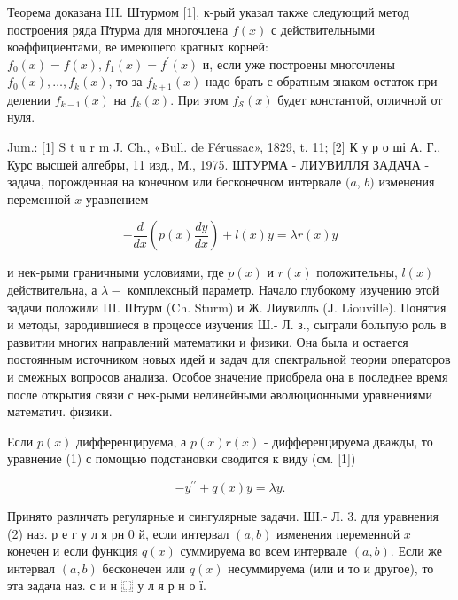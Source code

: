 \documentclass[10pt]{article}
\begin{document}
Теорема доказана III. Штурмом [1], к-рый указал также следующий метод построения ряда П̈турма для многочлена $f(x)$ с действительными коәффициентами, ве имеющего кратных корней: $f_{0}(x)=f(x), f_{1}(x)=f^{\prime}(x)$ и, если уже построены многочлены $f_{0}(x), \ldots, f_{k}(x)$, то за $f_{k+1}(x)$ надо брать с обратным знаком остаток при делении $f_{k-1}(x)$ на $f_{k}(x)$. При этом $f_{\mathcal{S}}(x)$ будет константой, отличной от нуля.



Jum.: [1] S t u r m J. Ch., «Bull. de Férussac», 1829, t. 11; [2] К у р о ші А. Г., Курс высшей алгебры, 11 изд., М., 1975. ШТУРМА - ЛИУВИЛЛЯ ЗАДАЧА - задача, порожденная на конечном или бесконечном интервале $(a$, $b)$ изменения переменной $x$ уравнением



\[

-\frac{d}{d x}\left(p(x) \frac{d y}{d x}\right)+l(x) y=\lambda r(x) y

\]



и нек-рыми граничными условиями, где $p(x)$ и $r(x)$ положительны, $l(x)$ действительна, а $\lambda-$ комплексный параметр. Начало глубокому изучению этой задачи положили III. Штурм (Ch. Sturm) и Ж. Лиувилль (J. Liouville). Понятия и методы, зародившиеся в процессе изучения Ш.- Л. з., сыграли больпую роль в развитии многих направлений математики и физики. Она была и остается постоянным источником новых идей и задач для спектральной теории операторов и смежных вопросов анализа. Особое значение приобрела она в последнее время после открытия связи с нек-рыми нелинейными әволюционными уравнениями математич. физики.



Если $p(x)$ дифференцируема, а $p(x) r(x)$ - дифференцируема дважды, то уравнение (1) с помощью подстановки сводится к виду (см. [1])



\[

-y^{\prime \prime}+q(x) y=\lambda y .

\]



Принято различать регулярные и сингулярные задачи. ШІ.- Л. 3. для уравнения (2) наз. р е г у л я рн 0 й, если интервал $(a, b)$ изменения переменной $x$ конечен и если функция $q(x)$ суммируема во всем интервале $(a, b)$. Если же интервал $(a, b)$ бесконечен или $q(x)$ несуммируема (или и то и другое), то эта задача наз. с и н $\mathbf{⿴}$ у л я р н о ї.
\end{document}
